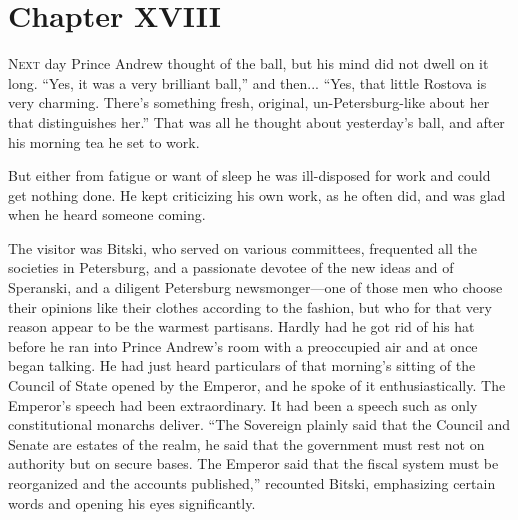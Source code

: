 
\chapter*{Chapter XVIII}
\ifaudio     
{} 
\fi

\lettrine[lines=2, loversize=0.3, lraise=0]{\initfamily N}{ext}
day Prince Andrew thought of the ball, but his mind did not
dwell on it long. ``Yes, it was a very brilliant ball,'' and
then... ``Yes, that little Rostova is very charming. There's
something fresh, original, un-Petersburg-like about her that
distinguishes her.'' That was all he thought about yesterday's
ball, and after his morning tea he set to work.

But either from fatigue or want of sleep he was ill-disposed for
work and could get nothing done. He kept criticizing his own
work, as he often did, and was glad when he heard someone coming.

The visitor was Bitski, who served on various committees,
frequented all the societies in Petersburg, and a passionate
devotee of the new ideas and of Speranski, and a diligent
Petersburg newsmonger---one of those men who choose their
opinions like their clothes according to the fashion, but who for
that very reason appear to be the warmest partisans. Hardly had
he got rid of his hat before he ran into Prince Andrew's room
with a preoccupied air and at once began talking. He had just
heard particulars of that morning's sitting of the Council of
State opened by the Emperor, and he spoke of it
enthusiastically. The Emperor's speech had been extraordinary. It
had been a speech such as only constitutional monarchs
deliver. ``The Sovereign plainly said that the Council and Senate
are estates of the realm, he said that the government must rest
not on authority but on secure bases. The Emperor said that the
fiscal system must be reorganized and the accounts published,''
recounted Bitski, emphasizing certain words and opening his eyes
significantly.


